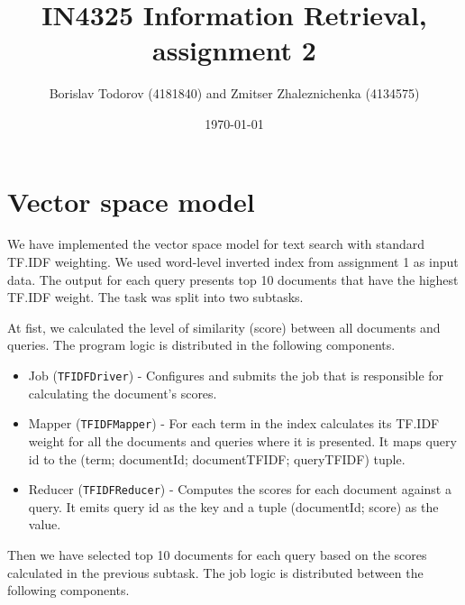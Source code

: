 \documentclass[a4paper, notitlepage]{article}
\begin{document}
\title{IN4325 Information Retrieval, assignment 2}
\author{Borislav Todorov (4181840) and Zmitser Zhaleznichenka (4134575)}
\date{\today}
\maketitle

\section{Vector space model}
We have implemented the vector space model for text search with standard TF.IDF weighting. We used word-level inverted index from assignment 1 as input data. The output for each query presents top 10 documents that have the highest TF.IDF weight. The task was split into two subtasks.

At fist, we calculated the level of similarity (score) between all documents and queries. The program logic is distributed in the following components.

\begin{itemize}
	\item Job (\lstinline{TFIDFDriver}) - Configures and submits the job that is responsible for calculating the document's scores.
	\item Mapper (\lstinline{TFIDFMapper}) - For each term in the index  calculates its TF.IDF weight for all the documents and queries where it is presented. It maps query id to the (term; documentId; documentTFIDF; queryTFIDF) tuple.
	\item Reducer (\lstinline{TFIDFReducer}) - Computes the scores for each document against a query. It emits query id as the key and a tuple (documentId; score) as the value. 
\end{itemize}

Then we have selected top 10 documents for each query based on the scores calculated in the previous subtask. The job logic is distributed between the following components.
\end{document}
